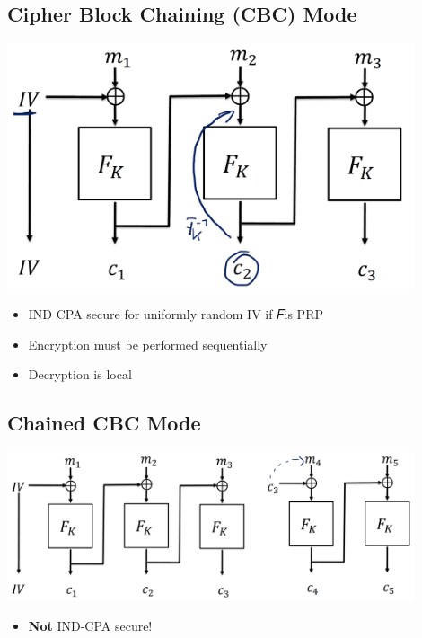 	\subsection{Cipher Block Chaining (CBC) Mode}
		\begin{center}
			\includegraphics[width=120mm]{Graphics/Block Ciphers/bc9.png}
		\end{center}
		\begin{itemize}
			\item IND CPA secure for uniformly random IV if 𝐹is PRP
			\item Encryption must be performed sequentially
			\item Decryption is local
		\end{itemize}
	
	\subsection{Chained CBC Mode}
		\begin{center}
			\includegraphics[width=120mm]{Graphics/Block Ciphers/bc10.png}
		\end{center}
		\begin{itemize}
			\item \textbf{Not} IND-CPA secure!
		\end{itemize}
	
